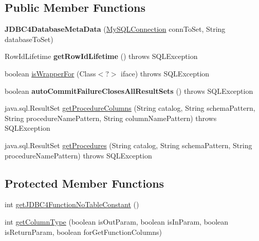\subsection*{Public Member Functions}
\begin{DoxyCompactItemize}
\item 
\mbox{\label{classcom_1_1mysql_1_1jdbc_1_1_j_d_b_c4_database_meta_data_a61b918bc89626223ece11df6272256be}} 
{\bfseries J\+D\+B\+C4\+Database\+Meta\+Data} (\mbox{\hyperlink{interfacecom_1_1mysql_1_1jdbc_1_1_my_s_q_l_connection}{My\+S\+Q\+L\+Connection}} conn\+To\+Set, String database\+To\+Set)
\item 
\mbox{\label{classcom_1_1mysql_1_1jdbc_1_1_j_d_b_c4_database_meta_data_a1fcda8669b33b9305e3c65b64cbd4d4e}} 
Row\+Id\+Lifetime {\bfseries get\+Row\+Id\+Lifetime} ()  throws S\+Q\+L\+Exception 
\item 
boolean \mbox{\hyperlink{classcom_1_1mysql_1_1jdbc_1_1_j_d_b_c4_database_meta_data_ab5b9cc928959ab14feba202c230b1a54}{is\+Wrapper\+For}} (Class$<$?$>$ iface)  throws S\+Q\+L\+Exception 
\item 
\mbox{\label{classcom_1_1mysql_1_1jdbc_1_1_j_d_b_c4_database_meta_data_ae185ad574e62f7cb09814d8dd53a38e2}} 
boolean {\bfseries auto\+Commit\+Failure\+Closes\+All\+Result\+Sets} ()  throws S\+Q\+L\+Exception 
\item 
java.\+sql.\+Result\+Set \mbox{\hyperlink{classcom_1_1mysql_1_1jdbc_1_1_j_d_b_c4_database_meta_data_ad0a1ffad3aaa5a817317e482b5c26125}{get\+Procedure\+Columns}} (String catalog, String schema\+Pattern, String procedure\+Name\+Pattern, String column\+Name\+Pattern)  throws S\+Q\+L\+Exception 
\item 
java.\+sql.\+Result\+Set \mbox{\hyperlink{classcom_1_1mysql_1_1jdbc_1_1_j_d_b_c4_database_meta_data_a7a77761d3bbbc91d21f84c243f7cf5d8}{get\+Procedures}} (String catalog, String schema\+Pattern, String procedure\+Name\+Pattern)  throws S\+Q\+L\+Exception 
\end{DoxyCompactItemize}
\subsection*{Protected Member Functions}
\begin{DoxyCompactItemize}
\item 
int \mbox{\hyperlink{classcom_1_1mysql_1_1jdbc_1_1_j_d_b_c4_database_meta_data_abf83d93b8b11a9ab21da030bfa320c67}{get\+J\+D\+B\+C4\+Function\+No\+Table\+Constant}} ()
\item 
int \mbox{\hyperlink{classcom_1_1mysql_1_1jdbc_1_1_j_d_b_c4_database_meta_data_a155ed928ee6454172e7e9eac80d923aa}{get\+Column\+Type}} (boolean is\+Out\+Param, boolean is\+In\+Param, boolean is\+Return\+Param, boolean for\+Get\+Function\+Columns)
\end{DoxyCompactItemize}

